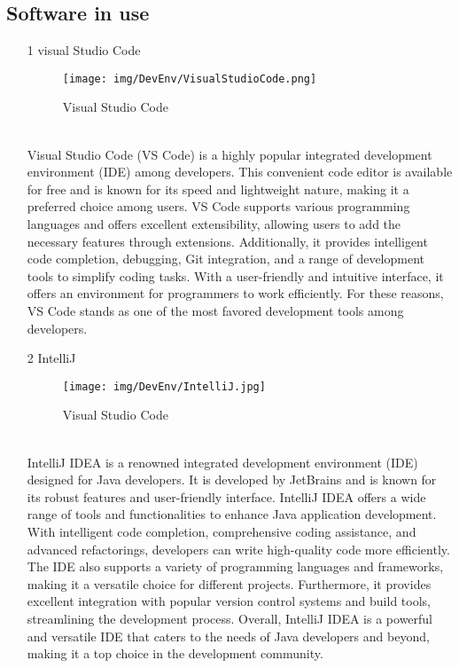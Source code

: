 \documentclass[conference]{IEEEtran}
\begin{document}
\subsection{Software in use}
\begin{enumerate}
\item[1] visual Studio Code
\begin{figure}[h]
\centering
\texttt{[image: img/DevEnv/VisualStudioCode.png]}
\caption{Visual Studio Code} 
\end{figure}\\
Visual Studio Code (VS Code) is a highly popular integrated development environment (IDE) among developers. This convenient code editor is available for free and is known for its speed and lightweight nature, making it a preferred choice among users. VS Code supports various programming languages and offers excellent extensibility, allowing users to add the necessary features through extensions. Additionally, it provides intelligent code completion, debugging, Git integration, and a range of development tools to simplify coding tasks. With a user-friendly and intuitive interface, it offers an environment for programmers to work efficiently. For these reasons, VS Code stands as one of the most favored development tools among developers.\\

\item[2] IntelliJ
\begin{figure}[h]
\centering
\texttt{[image: img/DevEnv/IntelliJ.jpg]}
\caption{Visual Studio Code} 
\end{figure}\\
IntelliJ IDEA is a renowned integrated development environment (IDE) designed for Java developers. It is developed by JetBrains and is known for its robust features and user-friendly interface. IntelliJ IDEA offers a wide range of tools and functionalities to enhance Java application development. With intelligent code completion, comprehensive coding assistance, and advanced refactorings, developers can write high-quality code more efficiently. The IDE also supports a variety of programming languages and frameworks, making it a versatile choice for different projects. Furthermore, it provides excellent integration with popular version control systems and build tools, streamlining the development process. Overall, IntelliJ IDEA is a powerful and versatile IDE that caters to the needs of Java developers and beyond, making it a top choice in the development community.\\


\end{enumerate}
\end{document}
